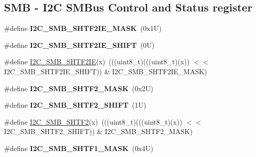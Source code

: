 \subsection*{S\+MB -\/ I2C S\+M\+Bus Control and Status register}
\begin{DoxyCompactItemize}
\item 
\mbox{\label{group___i2_c___register___masks_gad123ad3f9e1362d2ee5bd403cdf34327}} 
\#define {\bfseries I2\+C\+\_\+\+S\+M\+B\+\_\+\+S\+H\+T\+F2\+I\+E\+\_\+\+M\+A\+SK}~(0x1\+U)
\item 
\mbox{\label{group___i2_c___register___masks_ga431377427b6cae03a360309ac07a4559}} 
\#define {\bfseries I2\+C\+\_\+\+S\+M\+B\+\_\+\+S\+H\+T\+F2\+I\+E\+\_\+\+S\+H\+I\+FT}~(0\+U)
\item 
\#define \mbox{\hyperlink{group___i2_c___register___masks_gac8955a8d2c42508c67b42709dd15219c}{I2\+C\+\_\+\+S\+M\+B\+\_\+\+S\+H\+T\+F2\+IE}}(x)~(((uint8\+\_\+t)(((uint8\+\_\+t)(x)) $<$$<$ I2\+C\+\_\+\+S\+M\+B\+\_\+\+S\+H\+T\+F2\+I\+E\+\_\+\+S\+H\+I\+FT)) \& I2\+C\+\_\+\+S\+M\+B\+\_\+\+S\+H\+T\+F2\+I\+E\+\_\+\+M\+A\+SK)
\item 
\mbox{\label{group___i2_c___register___masks_gac393f25577923046bb7755b7f398db70}} 
\#define {\bfseries I2\+C\+\_\+\+S\+M\+B\+\_\+\+S\+H\+T\+F2\+\_\+\+M\+A\+SK}~(0x2\+U)
\item 
\mbox{\label{group___i2_c___register___masks_gaeaa26602cb9aabcf738aef5e95b7672c}} 
\#define {\bfseries I2\+C\+\_\+\+S\+M\+B\+\_\+\+S\+H\+T\+F2\+\_\+\+S\+H\+I\+FT}~(1\+U)
\item 
\#define \mbox{\hyperlink{group___i2_c___register___masks_gad70d76892456fd348b7fdc155b42d0d6}{I2\+C\+\_\+\+S\+M\+B\+\_\+\+S\+H\+T\+F2}}(x)~(((uint8\+\_\+t)(((uint8\+\_\+t)(x)) $<$$<$ I2\+C\+\_\+\+S\+M\+B\+\_\+\+S\+H\+T\+F2\+\_\+\+S\+H\+I\+FT)) \& I2\+C\+\_\+\+S\+M\+B\+\_\+\+S\+H\+T\+F2\+\_\+\+M\+A\+SK)
\item 
\mbox{\label{group___i2_c___register___masks_gaefffa6f332bf3bd19ea55db0d1848546}} 
\#define {\bfseries I2\+C\+\_\+\+S\+M\+B\+\_\+\+S\+H\+T\+F1\+\_\+\+M\+A\+SK}~(0x4\+U)
\item 
\mbox{\label{group___i2_c___register___masks_ga27af2fe0000903e76be422f1b0d0d277}} 

\end{DoxyCompactItemize}
